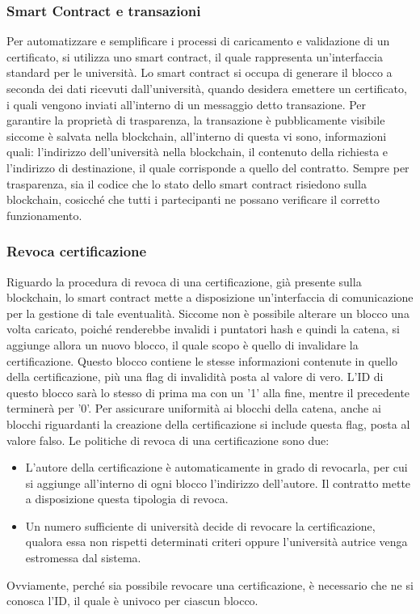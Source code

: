 \documentclass[a4paper,12pt]{article}
\begin{document}
\subsubsection{Smart Contract e transazioni}
Per automatizzare e semplificare i processi di caricamento e validazione di un certificato, si utilizza uno smart contract, il quale rappresenta un'interfaccia standard per le università. Lo smart contract si occupa di generare il blocco a seconda dei dati ricevuti dall'università, quando desidera emettere un certificato, i quali vengono inviati all'interno di un messaggio detto transazione.
\newline Per garantire la proprietà di trasparenza, la transazione è pubblicamente visibile siccome è salvata nella blockchain, all'interno di questa vi sono, informazioni quali: l'indirizzo dell'università nella blockchain, il contenuto della richiesta e l'indirizzo di destinazione, il quale corrisponde a quello del contratto. 
\newline Sempre per trasparenza, sia il codice che lo stato dello smart contract risiedono sulla blockchain, cosicché che tutti i partecipanti ne possano verificare il corretto funzionamento.
\subsubsection{Revoca certificazione}
Riguardo la procedura di revoca di una certificazione, già presente sulla blockchain, lo smart contract mette a disposizione un'interfaccia di comunicazione per la gestione di tale eventualità.
\newline Siccome non è possibile alterare un blocco una volta caricato, poiché renderebbe invalidi i puntatori hash e quindi la catena, si aggiunge allora un nuovo blocco, il quale scopo è quello di invalidare la certificazione. Questo blocco contiene le stesse informazioni contenute in quello della certificazione, più una flag di invalidità posta al valore di vero. L'ID di questo blocco sarà lo stesso di prima ma con un '1' alla fine, mentre il precedente terminerà per '0'.
\newline Per assicurare uniformità ai blocchi della catena, anche ai blocchi riguardanti la creazione della certificazione si include questa flag, posta al valore falso.
\newline Le politiche di revoca di una certificazione sono due: 
\begin{itemize}
    \item L'autore della certificazione è automaticamente in grado di revocarla, per cui si aggiunge all'interno di ogni blocco l'indirizzo dell'autore. Il contratto mette a disposizione questa tipologia di revoca.
    \item Un numero sufficiente di università decide di revocare la certificazione, qualora essa non rispetti determinati criteri oppure l'università autrice venga estromessa dal sistema. 
\end{itemize}
Ovviamente, perché sia possibile revocare una certificazione, è necessario che ne si conosca l'ID, il quale è univoco per ciascun blocco.
\end{document}
